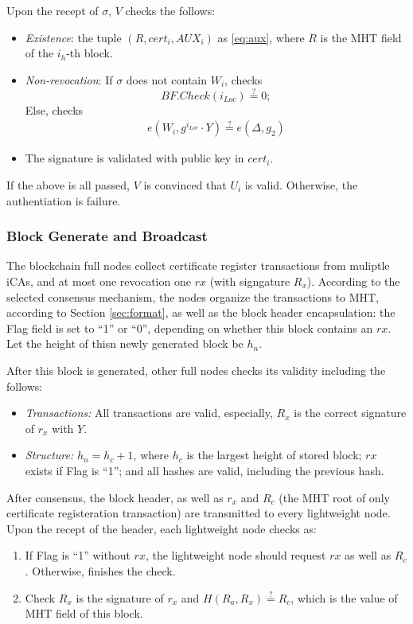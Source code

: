 \documentclass[conference]{IEEEtran}
\begin{document}
Upon the recept of $\sigma$, $V$ checks the follows:
\begin{itemize}
	\item \textit{Existence}: the tuple $(R, cert_i, AUX_i)$ as \eqref{eq:aux}, where $R$ is the MHT field of the $i_h$-th block.
	\item \textit{Non-revocation}: If $\sigma$ does not contain $W_i$, checks $$BF.Check(i_{Loc})\overset{?}{=} 0;$$ Else, checks 
	\begin{align} 
		e(W_i, g^{i_{Loc}}\cdot Y) \overset{?}{=} e(\Delta, g_2)
	\end{align}
	\item The signature is validated with public key in $cert_i$.
\end{itemize}
If the above is all passed, $V$ is convinced that $U_i$ is valid. Otherwise, the authentiation is failure. 


\subsubsection{Block Generate and Broadcast}\label{section:block_consensus}

The blockchain full nodes collect certificate register transactions from muliptle iCAs, and at most one revocation one $rx$ (with signgature $R_x$). According to the selected consensus mechanism, the nodes organize the transactions to MHT, according to Section \ref{sec:format}, as well as the block header encapsulation: the Flag field is set to ``1'' or ``0'', depending on whether this block contains an $rx$. Let the height of thisn newly generated block be $h_n$.

After this block is generated, other full nodes checks its validity including the follows:
\begin{itemize}
	\item \textit{Transactions:} All transactions are valid, especially, $R_x$ is the correct signature of $r_x$ with $Y$.
	\item \textit{Structure:} $h_n = h_c + 1$, where $h_c$ is the largest height of stored block; $rx$ exists if Flag is ``1''; and all hashes are valid, including the previous hash.
\end{itemize}

After consensus, the block header, as well as $r_x$ and $R_c$ (the MHT root of only certificate registeration transaction) are transmitted to every lightweight node. 
Upon the recept of the header, each lightweight node checks as: 
\begin{enumerate}
	\item If Flag is ``1'' without $rx$, the lightweight node should request $rx$ as well as $R_c$. Otherwise, finishes the check.
	\item  Check $R_x$ is the signature of $r_x$ and $H(R_a, R_x) \overset{?}{=} R_c$, which is the value of MHT field of this block. 
\end{enumerate}
\end{document}
